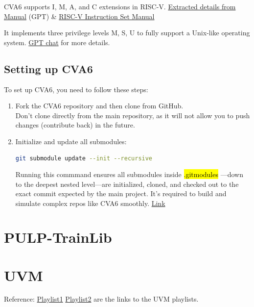 \documentclass[12pt, a4paper]{article}
\begin{document}
CVA6 supports I, M, A, and C extensions in RISC-V. \href{https://chatgpt.com/s/t_6859b7c99a1481919e4f0061d34eb39e}{Extracted details from Manual} (GPT) \& \href{https://www2.eecs.berkeley.edu/Pubs/TechRpts/2016/EECS-2016-118.pdf}{RISC-V Instruction Set Manual}

\vspace{0.5em}

It implements three privilege levels M, S, U to fully support a Unix-like operating system.
\href{https://chatgpt.com/s/t_6859b8e04be88191863e1d50b57d0f11}{GPT chat} for more details.

\subsection{Setting up CVA6}

To set up CVA6, you need to follow these steps:
\begin{enumerate}
    \item Fork the CVA6 repository and then clone from GitHub. \\
    Don't clone directly from the main repository, as it will not allow you to push changes (contribute back) in the future.

    \item Initialize and update all submodules:
        \begin{lstlisting}[language=bash, frame=single, basicstyle=\ttfamily\footnotesize]
    git submodule update --init --recursive
        \end{lstlisting}

        Running this commmand ensures all submodules inside \hl{.gitmodules} —down to the deepest nested level—are initialized, cloned, and checked out to the exact commit expected by the main project. It's required to build and simulate complex repos like CVA6 smoothly. \href{https://chatgpt.com/s/t_6859c638d5208191bfd8707c9580f31a}{Link}
        
\end{enumerate}



\section{PULP-TrainLib}

\section{UVM}
Reference: \href{https://youtube.com/playlist?list=PLuYB6t6povcLgoHWLJgk-VeMQ0Rscjw03&si=l-rjyvLkuttomYeC}{Playlist1}
\href{https://youtube.com/playlist?list=PLqPfWwayuBvNrr09dCweog1htCBLUbN4W&si=4vI1Fs_sgz-A0wXdC}{Playlist2} are the links to the UVM playlists.
\end{document}
